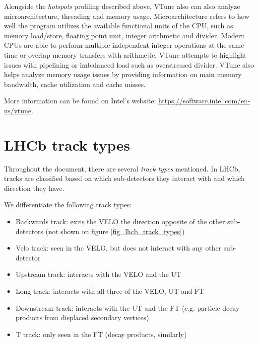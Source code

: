\documentclass[12pt]{article}
\begin{document}
Alongside the \textit{hotspots} profiling described above, VTune also can also analyze microarchitecture, threading and memory usage. Microarchitecture refers to how well the program utilizes the available functional units of the CPU, such as memory load/store, floating point unit, integer arithmetic and divider. Modern CPUs are able to perform multiple independent integer operations at the same time or overlap memory transfers with arithmetic. VTune attempts to highlight issues with pipelining or imbalanced load such as overstressed divider. VTune also helps analyze memory usage issues by providing information on main memory bandwidth, cache utilization and cache misses.
\vspace{1pc}

More information can be found on Intel's website: \url{https://software.intel.com/en-us/vtune}.

\section{LHCb track types}

Throughout the document, there are several \textit{track types} mentioned. In LHCb, tracks are classified based on which sub-detectors they interact with and which direction they have.
\vspace{1pc}

\noindent We differentiate the following track types:
\begin{itemize}
	\item Backwards track: exits the VELO the direction opposite of the other sub-detectors (not shown on figure \ref{fig_lhcb_track_types})
	\item Velo track: seen in the VELO, but does not interact with any other sub-detector
	\item Upstream track: interacts with the VELO and the UT
	\item Long track: interacts with all three of the VELO, UT and FT
	\item Downstream track: interacts with the UT and the FT (e.g. particle decay products from displaced secondary vertices)
	\item T track: only seen in the FT (decay products, similarly)
\end{itemize}
\end{document}
